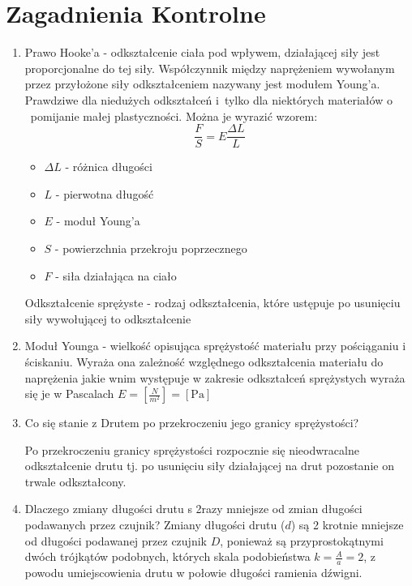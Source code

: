\documentclass[a4paper,10pt,twoside]{article}
\begin{document}
\section{Zagadnienia Kontrolne}
\begin{enumerate}
    \item \par{Prawo Hooke'a - odkształcenie ciała pod wpływem, działającej siły jest proporcjonalne do tej siły. Współczynnik między naprężeniem wywołanym przez przyłożone siły odkształceniem nazywany jest modułem Young'a. Prawdziwe dla niedużych odkształceń i~tylko dla niektórych materiałów o ~pomijanie małej plastyczności. Można je wyrazić  wzorem:
    \[\frac{F}{S}=E\frac{\Delta L}{L}\]}
    \begin{itemize}
        \item[ ] $\Delta L$ - różnica długości
        \item[ ]  $L$ - pierwotna długość
        \item[ ]  $E$ - moduł Young'a
        \item[ ]  $S$ - powierzchnia przekroju poprzecznego
        \item[ ]  $F$ - siła działająca na ciało
    \end{itemize}
    Odkształcenie sprężyste - rodzaj odkształcenia, które ustępuje po usunięciu siły wywołującej to odkształcenie 
    \addtocounter{enumi}{1}
    \addtocounter{enumi}{1}
    
    \item Moduł Younga - wielkość opisująca sprężystość materiału przy pościąganiu i ściskaniu. Wyraża ona zależność względnego odkształcenia materiału do naprężenia jakie wnim występuje w zakresie odkształceń sprężystych wyraża się je w Pascalach $E=\left[\frac{N}{m^2}\right]=[\text{Pa}]$ 
    
    \item Co się stanie z Drutem po przekroczeniu jego granicy sprężystości?
    
    Po przekroczeniu granicy sprężystości rozpocznie się nieodwracalne odkształcenie drutu tj. po usunięciu siły działającej na drut pozostanie on trwale odkształcony.
    
    \item Dlaczego zmiany długości drutu s 2razy mniejsze od zmian długości  podawanych przez czujnik?
    Zmiany długości drutu ($d$) są 2 krotnie mniejsze od długości podawanej przez czujnik $D$, ponieważ są przyprostokątnymi dwóch trójkątów podobnych, których skala podobieństwa $k=\frac{A}{a}=2$, z powodu umiejscowienia drutu w połowie długości ramienia dźwigni.
    

\end{enumerate}
\end{document}
